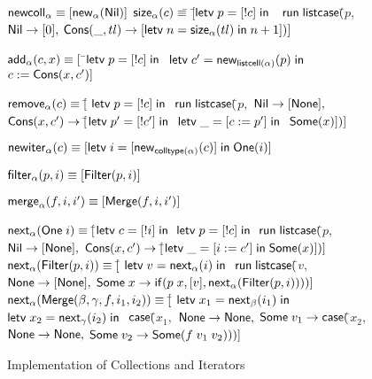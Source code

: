 \begin{figure}
\mbox{}
\begin{specification}
$\mathsf{newcoll}_\alpha \equiv [\mathsf{new}_{\alpha}(\mathsf{Nil})]$ 
$\mathsf{size}_\alpha(c) \equiv $\=
         $[$\=$\mathsf{letv}\;p = [!c]\;\mathsf{in}\;$ 
\nextline\> \>$\;
               \mathsf{run}\; \mathsf{listcase}($\=$p,$ 
\nextline\> \>                   \>$\mathsf{Nil} \to [0],$
\nextline\> \>                   \>$\mathsf{Cons}(\_, tl) \to 
                                     [\mathsf{letv}\;n = \mathsf{size}_\alpha(tl)\;\mathsf{in}\;n+1])]$

$\mathsf{add}_\alpha(c, x) \equiv [$
          \=$\mathsf{letv}\;p = [!c]\;\mathsf{in}\;$ 
\nextline \>$\mathsf{letv}\;c' = \mathsf{new}_{\mathsf{listcell}(\alpha)}(p)\;\mathsf{in}\;$ 
\nextline \>$c := \mathsf{Cons}(x, c')]$ 

$\mathsf{remove}_\alpha(c) \equiv [$\=
            $\mathsf{letv}\;p = [!c]\;\mathsf{in}\;$ 
\nextline \>$\mathsf{run}\;\mathsf{listcase}($\=$p,$ 
\nextline \>                                \>$\mathsf{Nil} \to [\mathsf{None}],$ 
\nextline \>                                \>$\mathsf{Cons}(x, c') \to [$\=$\mathsf{letv}\;p' = [!c']\;\mathsf{in}\;$ 
\nextline \>                                \> \>$\mathsf{letv}\;\_ = [c := p']\;\mathsf{in}\;$ 
\nextline \>                                \> \>$\mathsf{Some}(x)])]$

$\mathsf{newiter}_\alpha(c) \equiv [\mathsf{letv}\;i = [\mathsf{new}_{\mathsf{colltype}(\alpha)}(c)]\;\mathsf{in}\;\mathsf{One}(i)]$

$\mathsf{filter}_\alpha(p, i) \equiv [\mathsf{Filter}(p, i)]$

$\mathsf{merge}_\alpha(f, i, i') \equiv [\mathsf{Merge}(f, i, i')]$ 

$\mathsf{next}_\alpha(\mathsf{One}\;i) \equiv [$\=$\mathsf{letv}\;c = [!i]\;\mathsf{in}\;$ 
\nextline \> $\mathsf{letv}\;p = [!c]\;\mathsf{in}\;$ 
\nextline \> $\mathsf{run}\;\mathsf{listcase}($\=$p,$ 
\nextline \>                                  \>$\mathsf{Nil} \to [\mathsf{None}],$ 
\nextline \>                                  \>$\mathsf{Cons}(x, c') \to [$\=$\mathsf{letv}\;\_ = [i := c']\;\mathsf{in}\;\mathsf{Some}(x)])]$ 
$\mathsf{next}_\alpha(\mathsf{Filter}(p, i)) \equiv [$\= 
           $\letv{v}{\nextiter_\alpha(i)}$ 
\nextline\>$\mathsf{run}\;\mathsf{listcase}($\=$v,$ 
\nextline\>\> $\mathsf{None} \to [\mathsf{None}],$ 
\nextline\>\> $\mathsf{Some}\;x \to \mathsf{if}({p\;x}, {[v]}, {\mathsf{next}_\alpha(\mathsf{Filter}(p,i))}))]$ 
$\mathsf{next}_\alpha(\mathsf{Merge}(\beta, \gamma, f, i_1, i_2)) \equiv [$\=
            $\mathsf{letv}\;x_1 = \mathsf{next}_\beta(i_1)\;\mathsf{in}\;$ 
\nextline\> $\mathsf{letv}\;x_2 = \mathsf{next}_\gamma(i_2)\;\mathsf{in}\;$ 
\nextline\> $\mathsf{case}($\=$x_1,$ 
\nextline\> \>           $\mathsf{None} \to \mathsf{None},$ 
\nextline\> \>           $\mathsf{Some}\;v_1 \to \mathsf{case}($\=$x_2,$ 
\nextline\> \> \>                                 $\mathsf{None} \to \mathsf{None},$
\> \> \>                                 $\mathsf{Some}\;v_2 \to \mathsf{Some}(f\;v_1\;v_2)))]$
                                                   
\end{specification}
\caption{Implementation of Collections and Iterators}
\label{iterator-implementation}
\end{figure}

